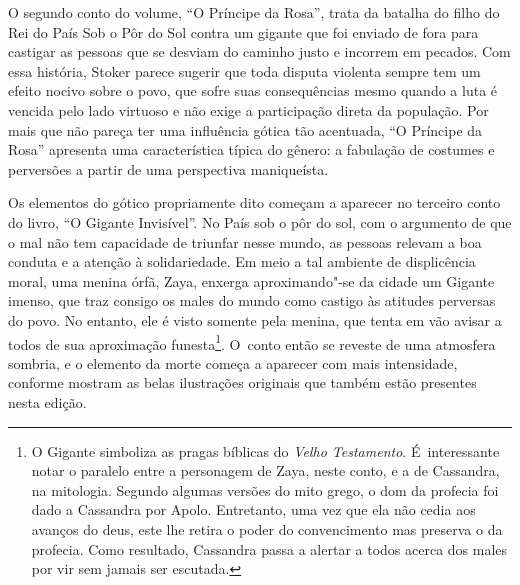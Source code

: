 O segundo conto do volume, ``O Príncipe da Rosa'', trata da batalha do
filho do Rei do País Sob o Pôr do Sol contra um gigante que foi enviado
de fora para castigar as pessoas que se desviam do caminho justo e
incorrem em pecados. Com essa história, Stoker parece sugerir que toda
disputa violenta sempre tem um efeito nocivo sobre o povo, que sofre
suas consequências mesmo quando a luta é vencida pelo lado virtuoso e
não exige a participação direta da população. Por mais que não pareça
ter uma influência gótica tão acentuada, ``O Príncipe da Rosa''
apresenta uma característica típica do gênero: a fabulação de costumes e
perversões a partir de uma perspectiva maniqueísta.

Os elementos do gótico propriamente dito começam a aparecer no terceiro
conto do livro, ``O Gigante Invisível''. No País sob o pôr do sol, com o
argumento de que o mal não tem capacidade de triunfar nesse mundo, as
pessoas relevam a boa conduta e a atenção à solidariedade. Em meio a
tal ambiente de displicência moral, uma menina órfã, Zaya, enxerga
aproximando"-se da cidade um Gigante imenso, que traz consigo os males do
mundo como castigo às atitudes perversas do povo. No entanto, ele é
visto somente pela menina, que tenta em vão avisar a todos de sua
aproximação funesta\footnote{O Gigante simboliza as pragas bíblicas do
\emph{Velho Testamento}. É~interessante notar o paralelo entre a
personagem de Zaya, neste conto, e a de Cassandra, na mitologia. Segundo
algumas versões do mito grego, o dom da profecia foi dado a Cassandra
por Apolo. Entretanto, uma vez que ela não cedia aos avanços do deus,
este lhe retira o poder do convencimento mas preserva o da profecia.
Como resultado, Cassandra passa a alertar a todos acerca dos males por
vir sem jamais ser escutada.}. O~conto então se reveste de
uma atmosfera sombria, e o elemento da morte começa a aparecer com mais
intensidade, conforme mostram as belas ilustrações originais que também
estão presentes nesta edição.

